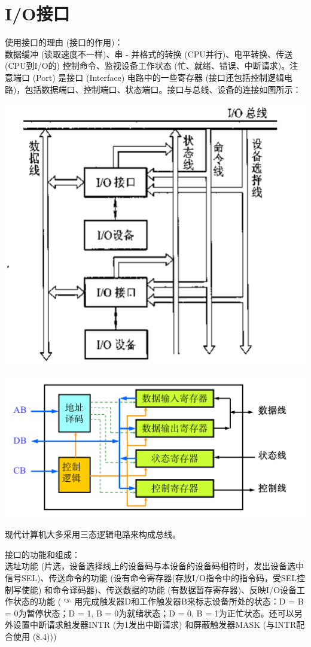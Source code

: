 \documentclass[]{report}
\begin{document}
		\section{I/O接口}
			使用接口的理由 (接口的作用)：\\数据缓冲 (读取速度不一样)、串 - 并格式的转换 (CPU并行)、电平转换、传送 (CPU到I/O的) 控制命令、监视设备工作状态 (忙、就绪、错误、中断请求)。注意端口 (Port) 是接口 (Interface) 电路中的一些寄存器 (接口还包括控制逻辑电路)，包括数据端口、控制端口、状态端口。接口与总线、设备的连接如图所示：\par
			\includegraphics[scale = 0.25]{../pictures/IO_Interafce.png}\par
			\includegraphics[scale = 0.25]{../pictures/IO_Interface_2.png}\par
			现代计算机大多采用三态逻辑电路来构成总线。\par\par
			接口的功能和组成：\\选址功能 (片选，设备选择线上的设备码与本设备的设备码相符时，发出设备选中信号SEL)、传送命令的功能 (设有命令寄存器(存放I/O指令中的指令码，受SEL控制写使能) 和命令译码器)、传送数据的功能 (有数据暂存寄存器)、反映I/O设备工作状态的功能 ( $^{eg.}$ 用完成触发器D和工作触发器B来标志设备所处的状态：D = B = 0为暂停状态；D = 1, B = 0为就绪状态；D = 0, B = 1为正忙状态。还可以另外设置中断请求触发器INTR (为1发出中断请求) 和屏蔽触发器MASK (与INTR配合使用 (8.4)))\par
\end{document}
